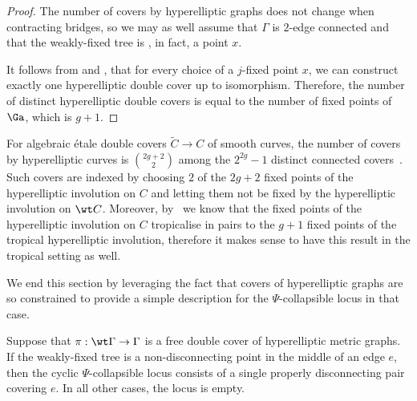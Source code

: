 \begin{proof}
       The number of covers by hyperelliptic graphs does not change when contracting bridges, so we may as well assume that $\Gamma$ is
     $2$-edge connected and that the weakly-fixed tree is , in fact, a point $x$. 

       It follows from  and , that for every choice of a $j$-fixed point $x$, we can construct exactly one hyperelliptic double cover up to isomorphism. Therefore,
        the number of distinct hyperelliptic double covers is equal to the number of fixed points of $\Ga$, which is $g+1$.
\end{proof}

\begin{rema}
    For algebraic \'etale double covers $\widetilde C\to C$ of smooth curves, the number of covers by hyperelliptic curves is $\binom{2g+2}{2}$ among the $2^{2g}-1$ distinct connected covers~\cite{HMfarkashypcovers}. 
   Such covers are indexed by choosing $2$  of the $2g+2$ fixed points of the hyperelliptic involution on $C$ and letting them not be fixed by the hyperelliptic involution on $\wt C$. 
     Moreover, by~\cite{Panizzut} we know that the  fixed points of the hyperelliptic involution on $C$ tropicalise in pairs to the $g+1$ fixed points of the tropical hyperelliptic involution, therefore it makes sense to have this result in the tropical setting as well.
  
\end{rema}

We end this section by leveraging the fact that covers of hyperelliptic graphs are so constrained    to provide a simple description for  the $\Psi$-collapsible locus in that case. 

\begin{lemma}\label{lem:CollapsibleLocusOfHyperelliptic}
    Suppose that $\pi:\wt\Gamma\to\Gamma$ is a free double cover of hyperelliptic metric graphs. If the weakly-fixed tree is a non-disconnecting point in the middle of an edge $e$, then the cyclic $\Psi$-collapsible locus consists of a single properly disconnecting pair covering $e$. In all other cases, the locus is empty. 
\end{lemma}

